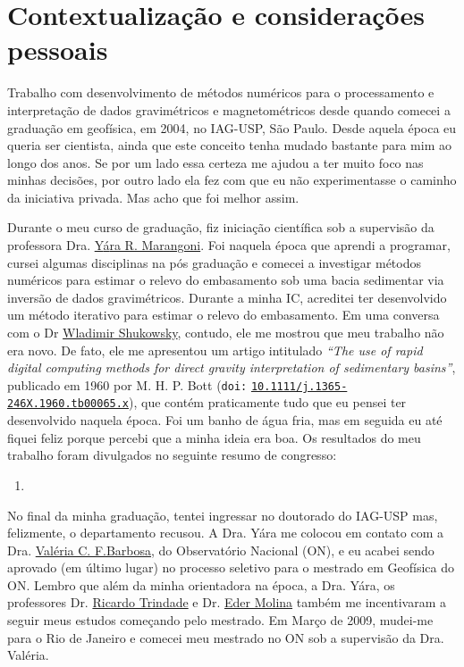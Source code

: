 \section{Contextualização e considerações pessoais}
\label{sec:apresentacao-consideracoes}

Trabalho com desenvolvimento de métodos numéricos para o processamento e
interpretação de dados gravimétricos e magnetométricos desde quando comecei
a graduação em geofísica, em 2004, no IAG-USP, São Paulo.
Desde aquela época eu queria ser cientista, ainda que este conceito tenha mudado 
bastante para mim ao longo dos anos. Se por um lado essa certeza me ajudou a 
ter muito foco nas minhas decisões, por outro lado ela fez com que eu não experimentasse
o caminho da iniciativa privada. Mas acho que foi melhor assim.

\bigskip

\noindent Durante o meu curso de graduação, fiz iniciação
científica sob a supervisão da professora Dra. \href{https://lattes.cnpq.br/5050611044655332}{Y{\'a}ra R. Marangoni}. 
Foi naquela época que aprendi a programar, cursei algumas disciplinas na pós graduação e 
comecei a investigar métodos numéricos para estimar o relevo do embasamento sob uma bacia
sedimentar via inversão de dados gravimétricos. 
Durante a minha IC, acreditei ter desenvolvido um método iterativo para estimar o relevo do
embasamento. 
Em uma conversa com o Dr \href{https://lattes.cnpq.br/6171841822916587}{Wladimir Shukowsky}, contudo, ele me mostrou que meu trabalho não
era novo.
De fato, ele me apresentou um artigo intitulado 
\textit{``The use of rapid digital computing methods for direct gravity interpretation of sedimentary basins''}, publicado em 1960 por M. H. P. Bott (\texttt{doi:} \href{https://doi.org/10.1111/j.1365-246X.1960.tb00065.x}{\texttt{10.1111/j.1365-246X.1960.tb00065.x}}), que contém praticamente tudo que eu pensei ter desenvolvido naquela época.
Foi um banho de água fria, mas em seguida eu até fiquei feliz porque percebi que a minha
ideia era boa. Os resultados do meu trabalho foram divulgados no seguinte resumo de 
congresso:
\begin{enumerate}
	\item {}
\end{enumerate}

\bigskip

\noindent No final da minha graduação, tentei ingressar no doutorado do IAG-USP mas, felizmente,
o departamento recusou. A Dra. Y{\'a}ra me colocou em contato com a Dra. \href{https://lattes.cnpq.br/0391036221142471}{Valéria C. F.Barbosa}, do Observatório Nacional (ON), e eu acabei sendo aprovado (em último lugar)
no processo seletivo para o mestrado em Geofísica do ON. Lembro que além da minha
orientadora na época, a Dra. Yára, os professores 
Dr. \href{https://lattes.cnpq.br/3934334115083849}{Ricardo Trindade} e
Dr. \href{https://lattes.cnpq.br/0921576804781499}{Eder Molina} também 
me incentivaram a seguir meus estudos começando pelo mestrado.
Em Março de 2009, mudei-me para o Rio de Janeiro e comecei meu mestrado no ON sob a
supervisão da Dra. Valéria.

